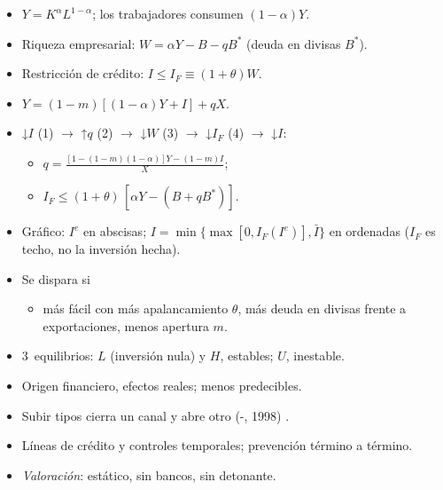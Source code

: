 \documentclass{article}
\begin{document}
\begin{columnas}
\begin{itemize}
\item $Y=K^\alpha L^{1-\alpha}$; los trabajadores consumen $(1-\alpha)Y$.
\item Riqueza empresarial: $W=\alpha Y-B-qB^*$ (deuda en divisas $B^*$).
\item Restricción de crédito: $I\le I_F\equiv(1+\theta)W$.
\item $Y=(1-m)[(1-\alpha)Y+I]+qX$.
\end{itemize}
\begin{itemize}
\item ↓$I$ (1) $\to$ ↑$q$ (2) $\to$ ↓$W$ (3) $\to$ ↓$I_F$ (4) $\to$ ↓$I$:
  \begin{itemize}
  \item $q=\frac{[1-(1-m)(1-\alpha)]Y-(1-m)I}{X}$;
  \item $I_F\le(1+\theta)\,[\alpha Y-(B+qB^*)]$.
  \end{itemize}
\item Gráfico: $I^e$ en abscisas; $I=\min\{\max[0,I_F(I^e)],\bar I\}$ en ordenadas ($I_F$ es techo, no la inversión hecha).
\item Se dispara si
  \begin{itemize}
  \item más fácil con más apalancamiento $\theta$, más deuda en divisas frente a exportaciones, menos apertura $m$.
  \end{itemize}
\item 3~equilibrios: $L$ (inversión nula) y $H$, estables; $U$, inestable.
\end{itemize}
\begin{itemize}
\item Origen financiero, efectos reales; menos predecibles.
\item Subir tipos cierra un canal y abre otro (-, 1998) .
\item Líneas de crédito y controles temporales; prevención término a término.
\item \emph{Valoración}: estático, sin bancos, sin detonante.
\end{itemize}


\end{columnas}
\end{document}
